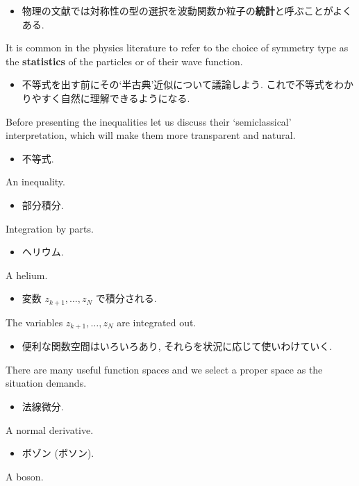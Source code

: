 \documentclass[openany, a4paper, oneside]{jsbook}
\begin{document}
\begin{itemize}
\item 物理の文献では対称性の型の選択を波動関数か粒子の\textbf{統計}と呼ぶことがよくある. \cite{LiebSeiringer1}
\end{itemize}
It is common in the physics literature to refer to the choice of symmetry type as the
\textbf{statistics} of the particles or of their wave function.

\begin{itemize}
\item 不等式を出す前にその`半古典'近似について議論しよう. これで不等式をわかりやすく自然に理解できるようになる. \cite{LiebSeiringer1}
\end{itemize}
Before presenting the inequalities let us discuss their `semiclassical' interpretation,
which will make them more transparent and natural.

\begin{itemize}
\item 不等式.
\end{itemize}
An inequality.

\begin{itemize}
\item 部分積分.
\end{itemize}
Integration by parts.

\begin{itemize}
\item ヘリウム.
\end{itemize}
A helium.

\begin{itemize}
\item 変数 $z_{k+1}, \dots, z_N$ で積分される. \cite{LiebSeiringer1}
\end{itemize}
The variables $z_{k+1}, \dots, z_N$ are integrated out.

\begin{itemize}
\item 便利な関数空間はいろいろあり, それらを状況に応じて使いわけていく.
\end{itemize}
There are many useful function spaces and we select a proper space as the situation demands.

\begin{itemize}
\item 法線微分.
\end{itemize}
A normal derivative.

\begin{itemize}
\item ボゾン (ボソン). \cite{LiebSeiringer1}
\end{itemize}
A boson.
\end{document}

